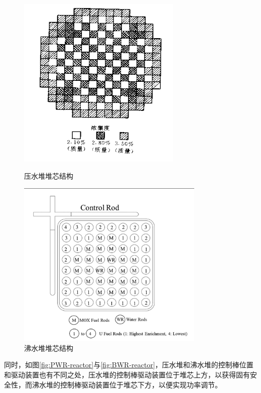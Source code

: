 \documentclass{article}
\begin{document}
\begin{figure}[htbp]
    \centering
    \begin{minipage}{0.45\textwidth}
        \centering
        \includegraphics[width=0.7\textwidth]{figures/PWR-fuel-rod.png}
        \caption{压水堆堆芯结构}
        \label{fig:PWR-fuel-rod}
    \end{minipage}
    \hfill
    \begin{minipage}{0.45\textwidth}
        \centering
        \includegraphics[width=0.8\textwidth]{figures/BWR-fuel-rod.png}
        \caption{沸水堆堆芯结构}
        \label{fig:BWR-fuel-rod}
    \end{minipage}
\end{figure}

同时，如图\ref{fig:PWR-reactor}与\ref{fig:BWR-reactor}，压水堆和沸水堆的控制棒位置和驱动装置也有不同之处，压水堆的控制棒驱动装置位于堆芯上方，以获得固有安全性，而沸水堆的控制棒驱动装置位于堆芯下方，以便实现功率调节。
\end{document}
